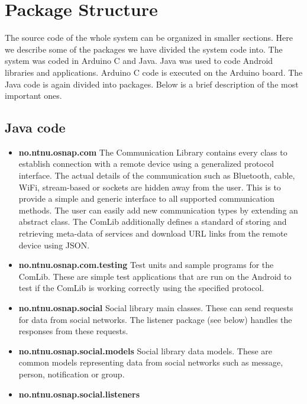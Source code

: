 \section{Package Structure}
The source code of the whole system can be organized in smaller sections.
Here we describe some of the packages we have divided the system code into.
The system was coded in Arduino C and Java. Java was used to code Android libraries and applications.
Arduino C code is executed on the Arduino board. The Java code is again divided into packages.
Below is a brief description of the most important ones.

\subsection{Java code}
\begin{itemize}
	\item \textbf{no.ntnu.osnap.com}\newline
		The Communication Library contains every class to establish connection with a remote device using a generalized
		protocol interface. The actual details of the communication such as Bluetooth, cable, WiFi, stream-based or
		sockets are hidden away from the user. This is to provide a simple and generic interface to all supported
		communication methods. The user can easily add new communication types by extending an abstract class.
		The ComLib additionally defines a standard of storing and retrieving meta-data of services and download URL
		links from the remote device using JSON.
	\item \textbf{no.ntnu.osnap.com.testing}\newline
		Test units and sample programs for the ComLib. These are simple test applications that are run on
		the Android to test if the ComLib is working correctly using the specified
		protocol.
	\item \textbf{no.ntnu.osnap.social}\newline
		Social library main classes. These can send requests for data from social networks. The listener package (see below) 
		handles the responses from these requests.
	\item \textbf{no.ntnu.osnap.social.models}\newline
		Social library data models. These are common models representing data from social networks such as message, person,
		notification or group.
	\item \textbf{no.ntnu.osnap.social.listeners}\newline

\end{itemize}
